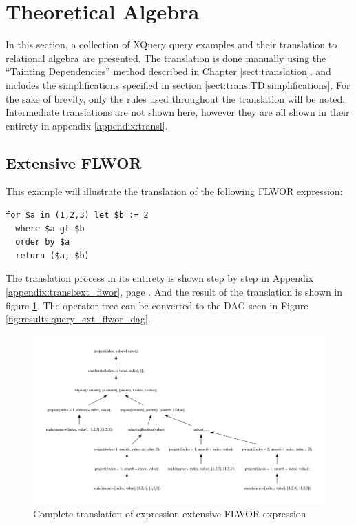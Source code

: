 \section{Theoretical Algebra}
\label{sect:result:theoretical_algebra}
In this section, a collection of XQuery query examples and their translation to
relational algebra are presented. The translation is done manually using the
``Tainting Dependencies'' method described in Chapter \ref{sect:translation},
and includes the simplifications specified in section
\ref{sect:trans:TD:simplifications}. For the sake of brevity, only the rules
used throughout the translation will be noted. Intermediate translations are
not shown here, however they are all shown in their entirety in appendix
\ref{appendix:transl}.

\subsection{Extensive FLWOR}
This example will illustrate the translation of the following FLWOR expression:

\begin{Verbatim}
for $a in (1,2,3) let $b := 2
  where $a gt $b
  order by $a
  return ($a, $b)
\end{Verbatim}

The translation process in its entirety is shown step by step in Appendix \ref{appendix:transl:ext_flwor}, page
\pageref{appendix:transl:ext_flwor}. And the result of the translation is shown in figure
\ref{fig:results:query_ext_flwor_result}. The operator tree can be converted to the DAG seen in Figure
\ref{fig:results:query_ext_flwor_dag}.

\begin{figure}[!htp]
\begin{center}
  \includegraphics[width=1.0\textwidth]{img/graphs/ext_flwor}
  \caption{Complete translation of expression extensive FLWOR expression}
  \label{fig:results:query_ext_flwor_result}
\end{center}
\end{figure}

